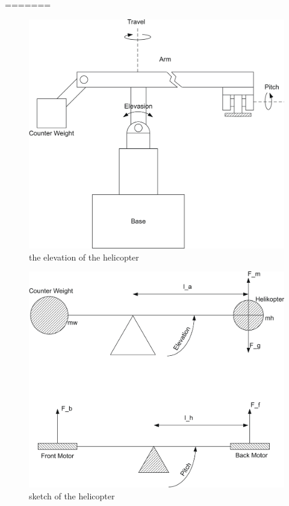 =======
\graphicspath{ {figures/} }
\begin{figure}[H]
\includegraphics[width=\textwidth]{HeliScatch1.png}
\caption{the elevation of the helicopter}
\label{fig:heli1}
\end{figure} 

\begin{figure}[H]
\includegraphics[width=\textwidth]{HeliScatch2.png}
\caption{sketch of the helicopter}
\label{fig:heli2}
\end{figure}

